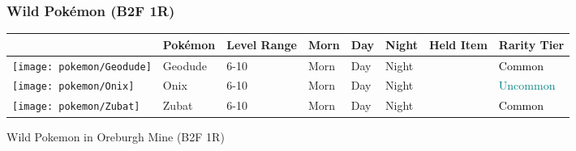 \subsubsection{Wild Pokémon (B2F 1R)}%
\label{ssubsec:WildPokmon(B2F1R)}%
\begin{longtable}{||l l l l l l l l||}%
\hline%
&Pokémon&Level Range&Morn&Day&Night&Held Item&Rarity Tier\\%
\hline%
\endhead%
\hline%
\texttt{[image: pokemon/Geodude]}&Geodude&6{-}10&Morn&Day&Night&&\textcolor{black}{%
Common%
}\\%
\hline%
\texttt{[image: pokemon/Onix]}&Onix&6{-}10&Morn&Day&Night&&\textcolor{teal}{%
Uncommon%
}\\%
\hline%
\texttt{[image: pokemon/Zubat]}&Zubat&6{-}10&Morn&Day&Night&&\textcolor{black}{%
Common%
}\\%
\hline%
\end{longtable}%
\caption{Wild Pokemon in Oreburgh Mine (B2F 1R)}